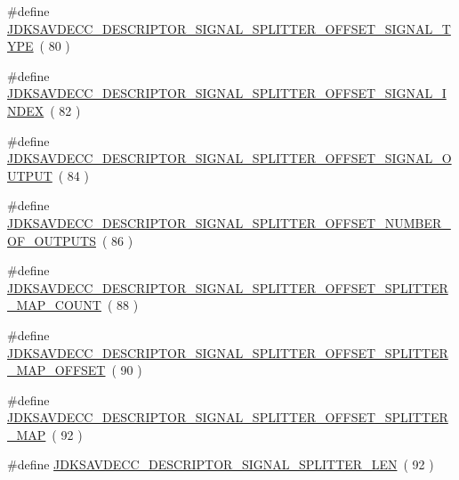 \begin{DoxyCompactItemize}
\item 
\#define \hyperlink{group__descriptor__signal__splitter_ga442468fe82e393db18c024a329c6261f}{J\+D\+K\+S\+A\+V\+D\+E\+C\+C\+\_\+\+D\+E\+S\+C\+R\+I\+P\+T\+O\+R\+\_\+\+S\+I\+G\+N\+A\+L\+\_\+\+S\+P\+L\+I\+T\+T\+E\+R\+\_\+\+O\+F\+F\+S\+E\+T\+\_\+\+S\+I\+G\+N\+A\+L\+\_\+\+T\+Y\+PE}~( 80 )
\item 
\#define \hyperlink{group__descriptor__signal__splitter_ga0a236a22986dd49125e5341b5f0ffc5d}{J\+D\+K\+S\+A\+V\+D\+E\+C\+C\+\_\+\+D\+E\+S\+C\+R\+I\+P\+T\+O\+R\+\_\+\+S\+I\+G\+N\+A\+L\+\_\+\+S\+P\+L\+I\+T\+T\+E\+R\+\_\+\+O\+F\+F\+S\+E\+T\+\_\+\+S\+I\+G\+N\+A\+L\+\_\+\+I\+N\+D\+EX}~( 82 )
\item 
\#define \hyperlink{group__descriptor__signal__splitter_gad399a0b84f4b04a54e00d07db3aaa6cf}{J\+D\+K\+S\+A\+V\+D\+E\+C\+C\+\_\+\+D\+E\+S\+C\+R\+I\+P\+T\+O\+R\+\_\+\+S\+I\+G\+N\+A\+L\+\_\+\+S\+P\+L\+I\+T\+T\+E\+R\+\_\+\+O\+F\+F\+S\+E\+T\+\_\+\+S\+I\+G\+N\+A\+L\+\_\+\+O\+U\+T\+P\+UT}~( 84 )
\item 
\#define \hyperlink{group__descriptor__signal__splitter_ga4c735a7ff8af7bc51d13d385fab7f20c}{J\+D\+K\+S\+A\+V\+D\+E\+C\+C\+\_\+\+D\+E\+S\+C\+R\+I\+P\+T\+O\+R\+\_\+\+S\+I\+G\+N\+A\+L\+\_\+\+S\+P\+L\+I\+T\+T\+E\+R\+\_\+\+O\+F\+F\+S\+E\+T\+\_\+\+N\+U\+M\+B\+E\+R\+\_\+\+O\+F\+\_\+\+O\+U\+T\+P\+U\+TS}~( 86 )
\item 
\#define \hyperlink{group__descriptor__signal__splitter_ga0f76965f28ec917134ffd474c1be8291}{J\+D\+K\+S\+A\+V\+D\+E\+C\+C\+\_\+\+D\+E\+S\+C\+R\+I\+P\+T\+O\+R\+\_\+\+S\+I\+G\+N\+A\+L\+\_\+\+S\+P\+L\+I\+T\+T\+E\+R\+\_\+\+O\+F\+F\+S\+E\+T\+\_\+\+S\+P\+L\+I\+T\+T\+E\+R\+\_\+\+M\+A\+P\+\_\+\+C\+O\+U\+NT}~( 88 )
\item 
\#define \hyperlink{group__descriptor__signal__splitter_gae5b6663f1b2154eccbda3561cec65a18}{J\+D\+K\+S\+A\+V\+D\+E\+C\+C\+\_\+\+D\+E\+S\+C\+R\+I\+P\+T\+O\+R\+\_\+\+S\+I\+G\+N\+A\+L\+\_\+\+S\+P\+L\+I\+T\+T\+E\+R\+\_\+\+O\+F\+F\+S\+E\+T\+\_\+\+S\+P\+L\+I\+T\+T\+E\+R\+\_\+\+M\+A\+P\+\_\+\+O\+F\+F\+S\+ET}~( 90 )
\item 
\#define \hyperlink{group__descriptor__signal__splitter_ga06e01705700a9d7e3f497da76b5a59e5}{J\+D\+K\+S\+A\+V\+D\+E\+C\+C\+\_\+\+D\+E\+S\+C\+R\+I\+P\+T\+O\+R\+\_\+\+S\+I\+G\+N\+A\+L\+\_\+\+S\+P\+L\+I\+T\+T\+E\+R\+\_\+\+O\+F\+F\+S\+E\+T\+\_\+\+S\+P\+L\+I\+T\+T\+E\+R\+\_\+\+M\+AP}~( 92 )
\item 
\#define \hyperlink{group__descriptor__signal__splitter_ga3afbcd74a73da7fe7c5eee3c13fad7f3}{J\+D\+K\+S\+A\+V\+D\+E\+C\+C\+\_\+\+D\+E\+S\+C\+R\+I\+P\+T\+O\+R\+\_\+\+S\+I\+G\+N\+A\+L\+\_\+\+S\+P\+L\+I\+T\+T\+E\+R\+\_\+\+L\+EN}~( 92 )
\end{DoxyCompactItemize}
